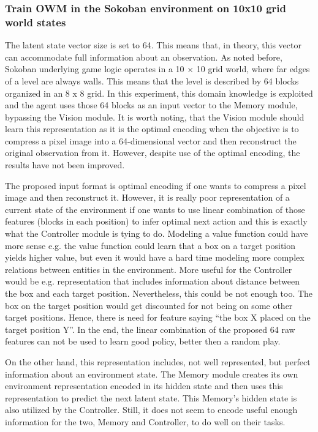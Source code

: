 \subsubsection{Train OWM in the Sokoban environment on 10x10 grid world states}

The latent state vector size is set to 64. This means that, in theory, this vector can accommodate full information about an observation. As noted before, Sokoban underlying game logic operates in a 10 × 10 grid world, where far edges of a level are always walls. This means that the level is described by 64 blocks organized in an 8 x 8 grid. In this experiment, this domain knowledge is exploited and the agent uses those 64 blocks as an input vector to the Memory module, bypassing the Vision module. It is worth noting, that the Vision module should learn this representation as it is the optimal encoding when the objective is to compress a pixel image into a 64-dimensional vector and then reconstruct the original observation from it. However, despite use of the optimal encoding, the results have not been improved.

The proposed input format is optimal encoding if one wants to compress a pixel image and then reconstruct it. However, it is really poor representation of a current state of the environment if one wants to use linear combination of those features (blocks in each position) to infer optimal next action and this is exactly what the Controller module is tying to do. Modeling a value function could have more sense e.g. the value function could learn that a box on a target position yields higher value, but even it would have a hard time modeling more complex relations between entities in the environment. More useful for the Controller would be e.g. representation that includes information about distance between the box and each target position. Nevertheless, this could be not enough too. The box on the target position would get discounted for not being on some other target positions. Hence, there is need for feature saying “the box X placed on the target position Y”. In the end, the linear combination of the proposed 64 raw features can not be used to learn good policy, better then a random play.

On the other hand, this representation includes, not well represented, but perfect information about an environment state. The Memory module creates its own environment representation encoded in its hidden state and then uses this representation to predict the next latent state. This Memory's hidden state is also utilized by the Controller. Still, it does not seem to encode useful enough information for the two, Memory and Controller, to do well on their tasks.

